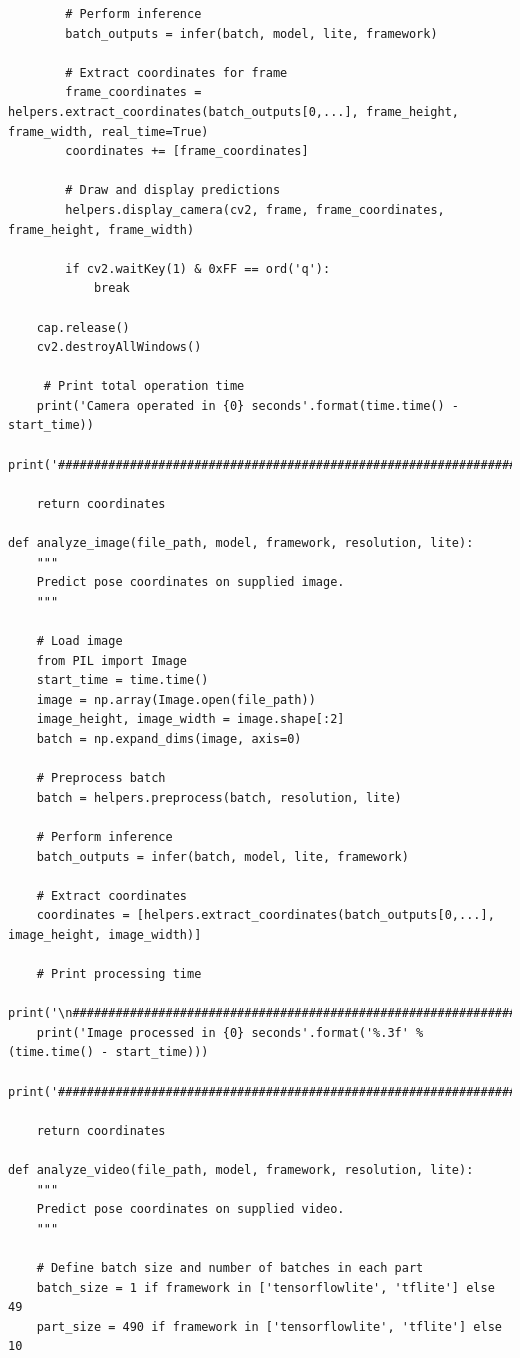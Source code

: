 \documentclass{fisatprojectfinal}
\begin{document}
\begin{appendices}
\begin{lstlisting}
        # Perform inference
        batch_outputs = infer(batch, model, lite, framework)

        # Extract coordinates for frame
        frame_coordinates = helpers.extract_coordinates(batch_outputs[0,...], frame_height, frame_width, real_time=True)
        coordinates += [frame_coordinates]
        
        # Draw and display predictions
        helpers.display_camera(cv2, frame, frame_coordinates, frame_height, frame_width)
        
        if cv2.waitKey(1) & 0xFF == ord('q'):
            break
            
    cap.release()
    cv2.destroyAllWindows()
    
     # Print total operation time
    print('Camera operated in {0} seconds'.format(time.time() - start_time))
    print('##########################################################################################################\n')
    
    return coordinates

def analyze_image(file_path, model, framework, resolution, lite):
    """
    Predict pose coordinates on supplied image.
    """
    
    # Load image
    from PIL import Image
    start_time = time.time()
    image = np.array(Image.open(file_path))
    image_height, image_width = image.shape[:2]
    batch = np.expand_dims(image, axis=0)

    # Preprocess batch
    batch = helpers.preprocess(batch, resolution, lite)
    
    # Perform inference
    batch_outputs = infer(batch, model, lite, framework)

    # Extract coordinates
    coordinates = [helpers.extract_coordinates(batch_outputs[0,...], image_height, image_width)]
    
    # Print processing time
    print('\n##########################################################################################################')
    print('Image processed in {0} seconds'.format('%.3f' % (time.time() - start_time)))
    print('##########################################################################################################\n')
    
    return coordinates
    
def analyze_video(file_path, model, framework, resolution, lite):
    """
    Predict pose coordinates on supplied video.
    """
    
    # Define batch size and number of batches in each part
    batch_size = 1 if framework in ['tensorflowlite', 'tflite'] else 49
    part_size = 490 if framework in ['tensorflowlite', 'tflite'] else 10
    

\end{lstlisting}
\end{appendices}
\end{document}
